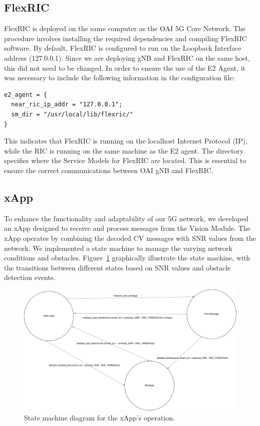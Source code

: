 \subsection{FlexRIC}\label{subsec:flexric}
FlexRIC is deployed on the same computer as the OAI 5G Core Network.
The procedure involves installing the required dependencies and compiling FlexRIC software.
By default, FlexRIC is configured to run on the Loopback Interface address (127.0.0.1).
Since we are deploying gNB and FlexRIC on the same host, this did not need to be changed.
In order to ensure the use of the E2 Agent, it was necessary to include the following information in the configuration file:

\begin{verbatim}
e2_agent = {
  near_ric_ip_addr = "127.0.0.1";
  sm_dir = "/usr/local/lib/flexric/"
}
\end{verbatim}

This indicates that FlexRIC is running on the localhost Internet Protocol (IP), while the RIC is running on the same machine as the E2 agent.
The directory specifies where the Service Models for FlexRIC are located.
This is essential to ensure the correct communications between OAI gNB and FlexRIC\@.

\subsection{xApp}\label{subsec:xapp}
To enhance the functionality and adaptability of our 5G network, we developed an xApp designed to receive and process messages from the Vision Module.
The xApp operates by combining the decoded CV messages with SNR values from the network.
We implemented a state machine to manage the varying network conditions and obstacles.
Figure~\ref{fig:state_xapp} graphically illustrate the state machine, with the transitions between different states based on SNR values and obstacle detection events.


\begin{figure}[H]
    \centering
    \includegraphics[width=0.8\linewidth]{figures/State_machine.drawio}
    \caption{State machine diagram for the xApp's operation.}
    \label{fig:state_xapp}
\end{figure}


